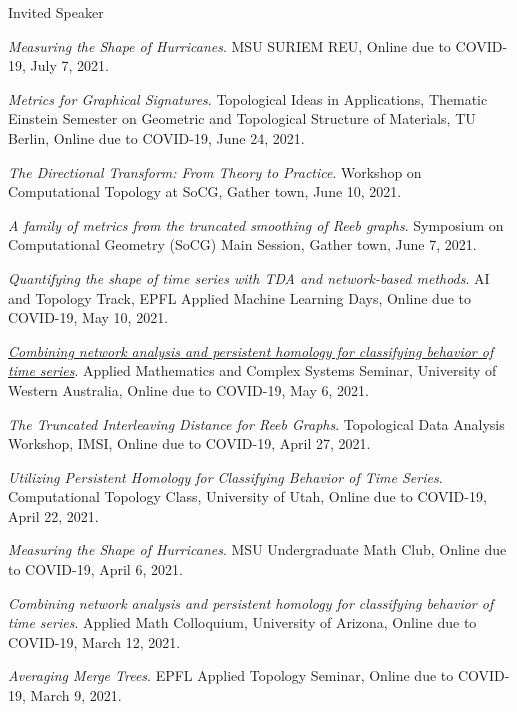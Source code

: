 \documentclass{resume} %
\begin{document}
\begin{rSection}{Invited Speaker}
\begin{etaremune}
\item\emph{Measuring the Shape of Hurricanes}. MSU SURIEM REU, Online due to COVID-19, July 7, 2021. 

\item\emph{Metrics for Graphical Signatures}. Topological Ideas in Applications, Thematic Einstein Semester on Geometric and Topological Structure of Materials, TU Berlin, Online due to COVID-19, June 24, 2021. 

\item\emph{The Directional Transform: From Theory to Practice}. Workshop on Computational Topology at SoCG, Gather town, June 10, 2021. 

\item\emph{A family of metrics from the truncated smoothing of Reeb graphs}. Symposium on Computational Geometry (SoCG) Main Session, Gather town, June 7, 2021. 

\item\emph{Quantifying the shape of time series with TDA and network-based methods}. AI and Topology Track, EPFL Applied Machine Learning Days, Online due to COVID-19, May 10, 2021. 

\item\emph{\href{https://www.youtube.com/watch?v=EUVk-FXbIog}{Combining network analysis and persistent homology for classifying behavior of time series}}. Applied Mathematics and Complex Systems Seminar, University of Western Australia, Online due to COVID-19, May 6, 2021. 

\item\emph{The Truncated Interleaving Distance for Reeb Graphs}. Topological Data Analysis Workshop, IMSI, Online due to COVID-19, April 27, 2021. 

\item\emph{Utilizing Persistent Homology for Classifying Behavior of Time Series}. Computational Topology Class, University of Utah, Online due to COVID-19, April 22, 2021. 

\item\emph{Measuring the Shape of Hurricanes}. MSU Undergraduate Math Club, Online due to COVID-19, April 6, 2021. 

\item\emph{Combining network analysis and persistent homology for classifying behavior of time series}. Applied Math Colloquium, University of Arizona, Online due to COVID-19, March 12, 2021. 

\item\emph{Averaging Merge Trees}. EPFL Applied Topology Seminar, Online due to COVID-19, March 9, 2021. 


\end{etaremune}
\end{rSection}
\end{document}
